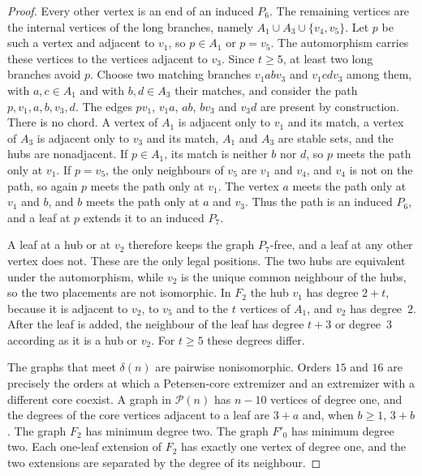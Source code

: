 \documentclass[ASNA]{USG}
\theoremstyle{WBstyletwo}
\numberwithin{equation}{section}
\begin{document}
\begin{proof}
Every other vertex is an end of an induced $P_6$. The remaining vertices are the internal vertices of the long branches, namely $A_1\cup A_3\cup\{v_4,v_5\}$. Let $p$ be such a vertex and adjacent to $v_1$, so $p\in A_1$ or $p=v_5$. The automorphism carries these vertices to the vertices adjacent to $v_3$. Since $t\ge 5$, at least two long branches avoid $p$. Choose two matching branches $v_1abv_3$ and $v_1cdv_3$ among them, with $a,c\in A_1$ and with $b,d\in A_3$ their matches, and consider the path $p,v_1,a,b,v_3,d$. The edges $pv_1$, $v_1a$, $ab$, $bv_3$ and $v_3d$ are present by construction. There is no chord. A vertex of $A_1$ is adjacent only to $v_1$ and its match, a vertex of $A_3$ is adjacent only to $v_3$ and its match, $A_1$ and $A_3$ are stable sets, and the hubs are nonadjacent. If $p\in A_1$, its match is neither $b$ nor $d$, so $p$ meets the path only at $v_1$. If $p=v_5$, the only neighbours of $v_5$ are $v_1$ and $v_4$, and $v_4$ is not on the path, so again $p$ meets the path only at $v_1$. The vertex $a$ meets the path only at $v_1$ and $b$, and $b$ meets the path only at $a$ and $v_3$. Thus the path is an induced $P_6$, and a leaf at $p$ extends it to an induced $P_7$.

A leaf at a hub or at $v_2$ therefore keeps the graph $P_7$-free, and a leaf at any other vertex does not. These are the only legal positions. The two hubs are equivalent under the automorphism, while $v_2$ is the unique common neighbour of the hubs, so the two placements are not isomorphic. In $F_2$ the hub $v_1$ has degree $2+t$, because it is adjacent to $v_2$, to $v_5$ and to the $t$ vertices of $A_1$, and $v_2$ has degree~$2$. After the leaf is added, the neighbour of the leaf has degree $t+3$ or degree~$3$ according as it is a hub or $v_2$. For $t\ge 5$ these degrees differ.

The graphs that meet $\delta(n)$ are pairwise nonisomorphic. Orders $15$ and $16$ are precisely the orders at which a Petersen-core extremizer and an extremizer with a different core coexist. A graph in $\mathcal P(n)$ has $n-10$ vertices of degree one, and the degrees of the core vertices adjacent to a leaf are $3+a$ and, when $b\ge 1$, $3+b$. The graph $F_2$ has minimum degree two. The graph $F'_0$ has minimum degree two. Each one-leaf extension of $F_2$ has exactly one vertex of degree one, and the two extensions are separated by the degree of its neighbour.


\end{proof}
\end{document}
